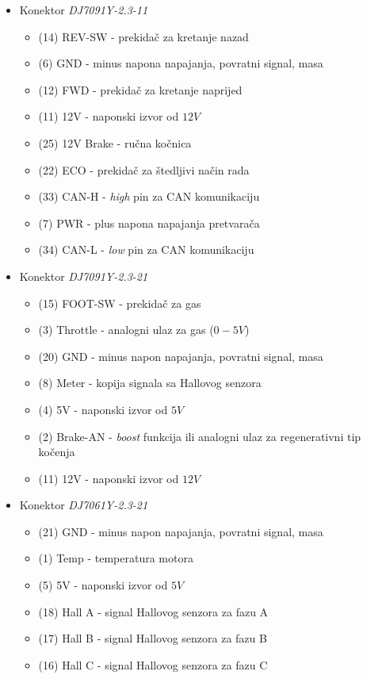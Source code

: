 \begin{itemize}
	\item Konektor \textit{DJ7091Y-2.3-11}
	\begin{itemize}
		\item (14) REV-SW - prekidač za kretanje nazad
		\item \hphantom{0}(6) GND - minus napona napajanja, povratni signal, masa
		\item (12) FWD - prekidač za kretanje naprijed
		\item (11) 12V - naponski izvor od $12V$
		\item (25) 12V Brake - ručna kočnica
		\item (22) ECO - prekidač za štedljivi način rada
		\item (33) CAN-H - \textit{high} pin za CAN komunikaciju
		\item \hphantom{0}(7) PWR - plus napona napajanja pretvarača
		\item (34) CAN-L - \textit{low} pin za CAN komunikaciju
	\end{itemize}
	\item Konektor \textit{DJ7091Y-2.3-21}
		\begin{itemize}
		\item (15) FOOT-SW - prekidač za gas
		\item \hphantom{0}(3) Throttle - analogni ulaz za gas ($0-5V$)
		\item (20) GND - minus napon napajanja, povratni signal, masa
		\item \hphantom{0}(8) Meter - kopija signala sa Hallovog senzora
		\item \hphantom{0}(4) 5V - naponski izvor od $5V$
		\item \hphantom{0}(2) Brake-AN - \textit{boost} funkcija ili analogni ulaz za regenerativni tip kočenja
		\item (11) 12V - naponski izvor od $12V$
	\end{itemize}
	\item Konektor \textit{DJ7061Y-2.3-21}
		\begin{itemize}
		\item (21) GND - minus napon napajanja, povratni signal, masa
		\item \hphantom{0}(1) Temp - temperatura motora
		\item \hphantom{0}(5) 5V - naponski izvor od $5V$
		\item (18) Hall A - signal Hallovog senzora za fazu A
		\item (17) Hall B - signal Hallovog senzora za fazu B 
		\item (16) Hall C - signal Hallovog senzora za fazu C 
	\end{itemize}
\end{itemize}

